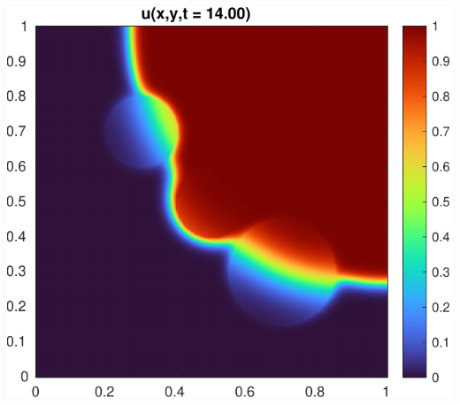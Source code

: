 \documentclass[14pt,aspectratio=169]{beamer}
\begin{document}
\begin{frame}
	\centering
	\includegraphics[height=\textheight]{figs/S10.pdf}
\end{frame}
\end{document}
